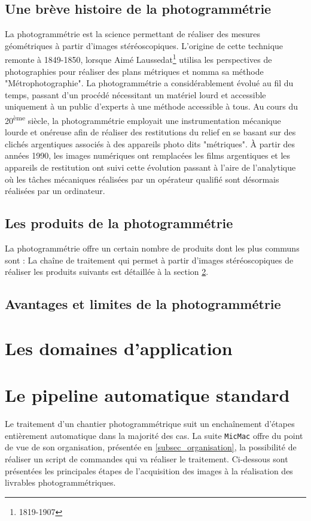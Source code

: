 \documentclass[a4paper,10pt]{article} %
\newcommand{\up}[1]{\textsuperscript{#1}} %
\begin{document}
\subsection{Une brève histoire de la photogrammétrie}
La photogrammétrie est la science permettant de réaliser des mesures géométriques à partir d'images stéréoscopiques. L'origine de cette technique remonte à 1849-1850, lorsque Aimé Laussedat\footnote{1819-1907} utilisa les perspectives de photographies pour réaliser des plans métriques et nomma sa méthode  "Métrophotographie". La photogrammétrie a considérablement évolué au fil du temps, passant d'un procédé nécessitant un matériel lourd et accessible uniquement à un public d'experts à une méthode accessible à tous. Au cours du 20\up{ème} siècle, la photogrammétrie employait une instrumentation mécanique lourde et onéreuse afin de réaliser des restitutions du relief en se basant sur des clichés argentiques associés à des appareils photo dits "métriques". À partir des années 1990, les images numériques ont remplacées les films argentiques et les appareils de restitution ont suivi cette évolution passant à l'aire de l'analytique où les tâches mécaniques réalisées par un opérateur qualifié sont désormais réalisées par un ordinateur.

\subsection{Les produits de la photogrammétrie}
La photogrammétrie offre un certain nombre de produits dont les plus communs sont : La chaîne de traitement qui permet à partir d'images stéréoscopiques de réaliser les produits suivants est détaillée à la section \ref{sec_pipeline_auto}.
\subsection{Avantages et limites de la photogrammétrie}

\section{Les domaines d'application}

\section{Le pipeline automatique standard}\label{sec_pipeline_auto}
Le traitement d'un chantier photogrammétrique suit un enchaînement d'étapes entièrement automatique dans la majorité des cas. La suite {\tt MicMac} offre du point de vue de son organisation, présentée en \ref{subsec_organisation}, la possibilité de réaliser un script de commandes qui va réaliser le traitement. Ci-dessous sont présentées les principales étapes de l'acquisition des images à la réalisation des livrables photogrammétriques.
\end{document}
